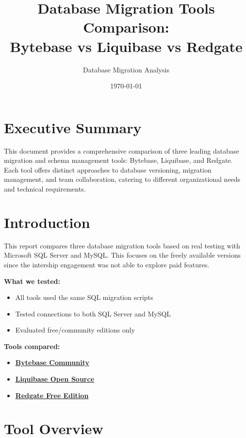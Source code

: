 \documentclass[11pt,a4paper]{article}
\title{Database Migration Tools Comparison: \\
Bytebase vs Liquibase vs Redgate}
\author{Database Migration Analysis}
\date{\today}
\begin{document}
\maketitle

\tableofcontents
\newpage

\section{Executive Summary}

This document provides a comprehensive comparison of three leading database migration and schema management tools: Bytebase, Liquibase, and Redgate. Each tool offers distinct approaches to database versioning, migration management, and team collaboration, catering to different organizational needs and technical requirements.

\section{Introduction}

This report compares three database migration tools based on real testing with Microsoft SQL Server and MySQL.
This focuses on the freely available versions since the intership engagement was not able to explore paid features.

\textbf{What we tested:}
\begin{itemize}
    \item All tools used the same SQL migration scripts
    \item Tested connections to both SQL Server and MySQL
    \item Evaluated free/community editions only
\end{itemize}

\textbf{Tools compared:}
\begin{itemize}
    \item \href{https://bytebase.com}{\textbf{Bytebase Community}}
    \item \href{https://liquibase.org}{\textbf{Liquibase Open Source}}
    \item \href{https://www.red-gate.com/products/sql-development/sql-compare/}{\textbf{Redgate Free Edition}}
\end{itemize}

\newpage
\section{Tool Overview}
\end{document}
